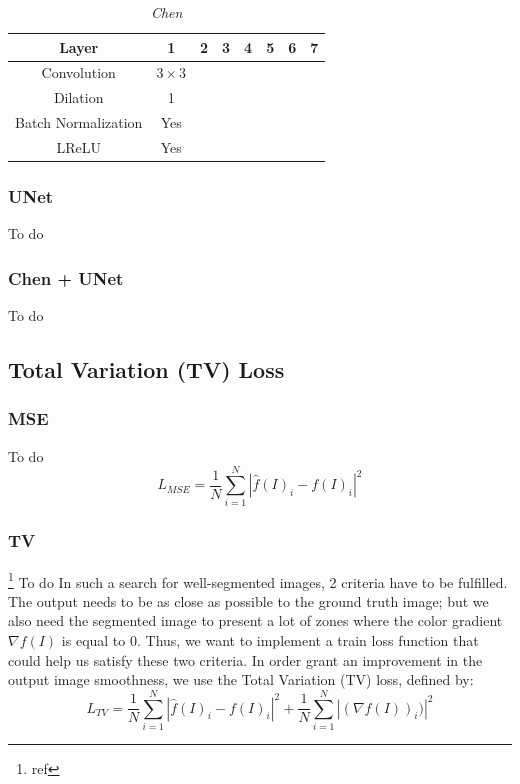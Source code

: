 \documentclass{article}
\begin{document}
            \begin{table}[!ht]
                \centering
                \begin{tabular}{|c|c|c|c|c|c|c|c|}
                    \hline
                    Layer & 1 & 2 & 3 & 4 & 5 & 6 & 7\\
                    \hline \hline
                    Convolution & $3\times3$ & & & & & & \\
                    \hline
                    Dilation & 1 & & & & & & \\
                    \hline
                    Batch Normalization & Yes & & & & & & \\
                    \hline
                    LReLU & Yes & & & & & & \\
                    \hline
                \end{tabular}
                \caption{\textit{Chen}}
            \end{table}

        \subsubsection{UNet}
        To do
        \subsubsection{Chen + UNet}
        To do

    \subsection{Total Variation (TV) Loss}
        \subsubsection{MSE}
        To do
        $$L_{MSE}=\frac{1}{N}\sum_{i=1}^N |\hat{f}(I)_i-f(I)_i|^2$$

        \subsubsection{TV}\footnote{ref}
        To do
            In such a search for well-segmented images, 2 criteria have to be fulfilled. The output needs to be as close as possible to the ground truth image; but we also need the segmented image to present a lot of zones where the color gradient $\nabla f(I)$ is equal to $0$. Thus, we want to implement a train loss function that could help us satisfy these two criteria.
            In order grant an improvement in the output image smoothness, we use the Total Variation (TV) loss, defined by:
            $$
            L_{TV}=\frac{1}{N}\sum_{i=1}^N |\hat{f}(I)_i-f(I)_i|^2+\frac{1}{N}\sum_{i=1}^N|(\nabla f(I))_i)|^2
            $$
\end{document}
